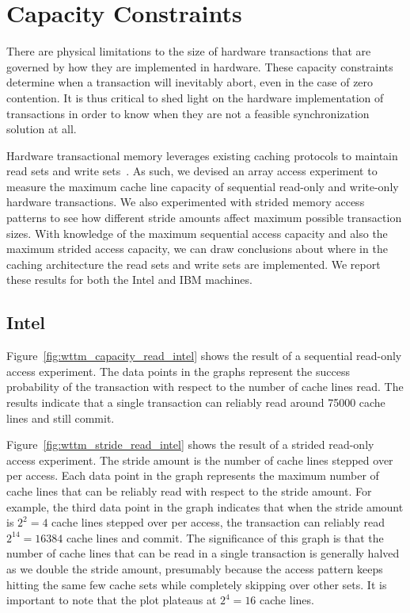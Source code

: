 
\section{Capacity Constraints}
There are physical limitations to the size of hardware transactions that are
governed by how they are implemented in hardware. These capacity constraints
determine when a transaction will inevitably abort, even in the case of zero
contention. It is thus critical to shed light on the hardware implementation of
transactions in order to know when they are not a feasible synchronization
solution at all.

Hardware transactional memory leverages existing caching protocols to maintain
read sets and write sets~\cite{YooHuLa13}. As such, we devised an array access
experiment to measure the maximum cache line capacity of sequential read-only and write-only
hardware transactions. We also experimented with strided memory access patterns
to see how different stride amounts affect maximum possible transaction sizes.
With knowledge of the maximum sequential access capacity and also the maximum
strided access capacity, we can draw conclusions about where in the caching
architecture the read sets and write sets are implemented. We report these
results for both the Intel and IBM machines.

\subsection*{Intel}

Figure~\ref{fig:wttm_capacity_read_intel} shows the result of a sequential
read-only access experiment. The data points in the graphs represent the success
probability of the transaction with respect to the number of cache lines read.
The results indicate that a single transaction can reliably read 
around 75000 cache lines and still commit.

Figure~\ref{fig:wttm_stride_read_intel} shows the result of a strided read-only
access experiment. The stride amount is the number of cache lines stepped over
per access. Each data point in the graph represents the maximum number of cache
lines that can be reliably read with respect to the stride amount. For example,
the third data point in the graph indicates that when the stride amount is
$2^2=4$ cache lines stepped over per access, the transaction can reliably read
$2^{14}=16384$ cache lines and commit. The significance of this graph is that
the number of cache lines that can be read in a single transaction is generally
halved as we double the stride amount, presumably because the access pattern
keeps hitting the same few cache sets while completely skipping over other sets.
It is important to note that the plot plateaus at $2^4=16$ cache lines.

